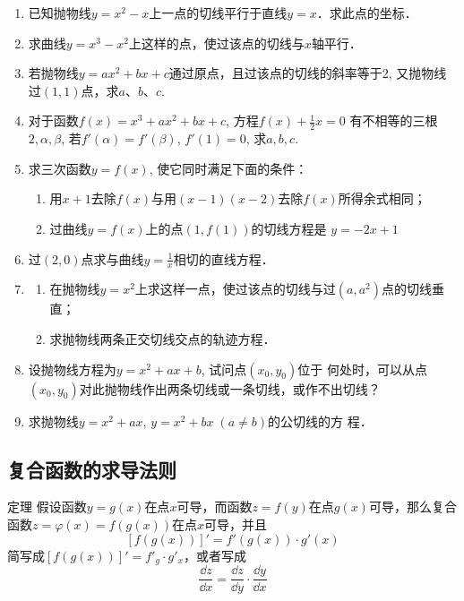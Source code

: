 \begin{ex}
\begin{enumerate}
\item 已知抛物线$y=x^2-x$上一点的切线平行于直线$y=x$．求此点的坐标．
\item 求曲线$y=x^3-x^2$上这样的点，使过该点的切线与$x$轴平行．
\item 若抛物线$y=ax^2+bx+c$通过原点，且过该点的切线的斜率等于2, 又抛物线过$(1, 1)$点，求$a$、$b$、$c$.
\item 对于函数$f(x)=x^3+ax^2+bx+c$, 方程$f(x)+\frac{1}{2}x=0$
有不相等的三根$2,\alpha,\beta$, 若$f'(\alpha)=f'(\beta)$, $f'(1)=0$, 求$a,b,c$.
\item 求三次函数$y=f(x)$, 使它同时满足下面的条件：
\begin{enumerate}
    \item 用$x+1$去除$f(x)$与用$(x-1)(x-2)$去除$f(x)$所得余式相同；
    \item 过曲线$y=f(x)$上的点$(1,f(1))$的切线方程是
$y=-2x+1$
\end{enumerate}
\item 
过$(2, 0)$点求与曲线$y=\frac{1}{x}$相切的直线方程．
\item 
\begin{enumerate}
\item 在抛物线$y=x^2$上求这样一点，使过该点的切线与过$(a,a^2)$点的切线垂直；
\item 求抛物线两条正交切线交点的轨迹方程．
\end{enumerate}

\item 设抛物线方程为$y=x^2+ax+b$, 试问点$(x_0,y_0)$位于
何处时，可以从点$(x_0,y_0)$对此抛物线作出两条切线或一条切线，或作不出切线？
\item 求抛物线$y=x^2+ax$, $y=x^2+bx\; (a\ne b)$的公切线的方
程．
\end{enumerate} 
\end{ex}

\subsection{复合函数的求导法则}
\begin{blk}
    {定理} 假设函数$y=g(x)$在点$x$可导，而函数$z=f(y)$在点$g(x)$可导，那么复合函数$z=\varphi(x)=f(g(x))$在点$x$可导，并且
\[[f(g(x))]'=f'(g(x))\cdot g'(x)\]
简写成$[f(g(x))]'=f'_g\cdot g'_x$，或者写成
\[\frac{\dd z}{\dd x}=\frac{\dd z}{\dd y}\cdot \frac{\dd y}{\dd x}\]
\end{blk}

